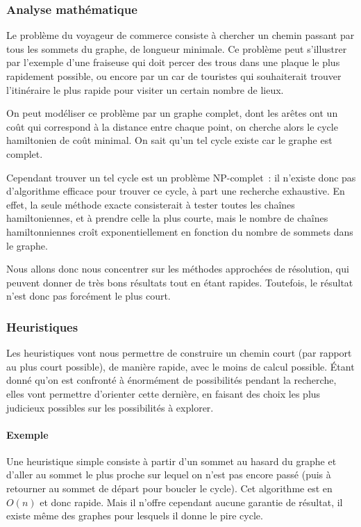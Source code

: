   \subsubsection{Analyse mathématique}
    Le problème du voyageur de commerce consiste à chercher un chemin passant
    par tous les sommets du graphe, de longueur minimale.
    Ce problème peut s'illustrer par l'exemple d'une
    fraiseuse qui doit percer des trous dans une plaque le plus
    rapidement possible, ou encore par un car de touristes qui souhaiterait
    trouver l'itinéraire le plus rapide pour visiter un certain nombre de lieux.

    On peut modéliser ce problème par un graphe complet, dont les arêtes ont un
    coût qui correspond à la distance entre chaque point, on cherche alors le
    cycle hamiltonien de coût minimal. On sait qu'un tel cycle existe car le
    graphe est complet.

    Cependant trouver un tel cycle est un problème NP-complet~: il n'existe
    donc pas d'algorithme efficace pour trouver ce cycle, à part une recherche
    exhaustive.
    En effet, la seule méthode exacte consisterait à tester toutes les chaînes
    hamiltoniennes, et à prendre celle la plus courte, mais le nombre de chaînes
    hamiltonniennes croît exponentiellement en fonction du nombre de sommets
    dans le graphe.

    Nous allons donc nous concentrer sur les méthodes approchées de résolution,
    qui peuvent donner de très bons résultats tout en étant rapides.
    Toutefois, le résultat n'est donc pas forcément le plus court.

  \subsubsection{Heuristiques}
    Les heuristiques vont nous permettre de construire un chemin court (par
    rapport au plus court possible), de manière rapide, avec le moins de calcul
    possible.  Étant donné qu'on est confronté à énormément de possibilités
    pendant la recherche, elles vont permettre d'orienter cette dernière, en
    faisant des choix les plus judicieux possibles sur les possibilités à
    explorer.

    \paragraph{Exemple} Une heuristique simple consiste à partir d'un sommet au
    hasard du graphe et d'aller au sommet le plus proche sur lequel on n'est
    pas encore passé (puis à retourner au sommet de départ pour boucler le
    cycle). Cet algorithme est en $O(n)$ et donc rapide. Mais il n'offre
    cependant aucune garantie de résultat, il existe même des graphes pour
    lesquels il donne le pire cycle.

